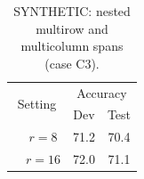 \begin{table}[t]
\centering
\caption{SYNTHETIC: nested multirow and multicolumn spans (case C3).}
\label{tab:synthetic-c3}
\begin{tabular}{lccc}
\toprule
\multicolumn{2}{c}{\multirow{2}{*}{Setting}} & \multicolumn{2}{c}{Accuracy} \\
\multicolumn{2}{c}{} & Dev & Test \\
\midrule
\multirow{2}{*}{\multicolumn{1}{l}{LoRA}} & $r=8$ & 71.2 & 70.4 \\
 & $r=16$ & 72.0 & 71.1 \\
\bottomrule
\end{tabular}
\end{table}
